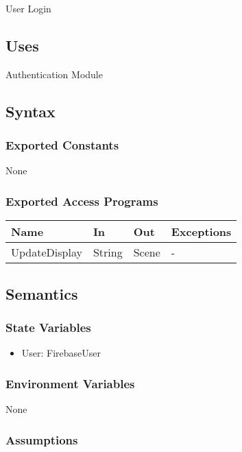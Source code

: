 \documentclass[12pt, titlepage]{article}
\begin{document}
User Login

\subsection{Uses}

Authentication Module

\subsection{Syntax}

\subsubsection{Exported Constants}

None

\subsubsection{Exported Access Programs}

\begin{center}
	\begin{tabular}{p{4cm} p{2cm} p{4cm} p{4cm}}
	\hline
	\textbf{Name} & \textbf{In} & \textbf{Out} & \textbf{Exceptions} \\
	\hline
	UpdateDisplay & String & Scene & - \\
	\hline
	\end{tabular}
\end{center}

\subsection{Semantics}

\subsubsection{State Variables}

\begin{itemize}
\item User: FirebaseUser
\end{itemize}

\subsubsection{Environment Variables}

None

\subsubsection{Assumptions}
\end{document}
